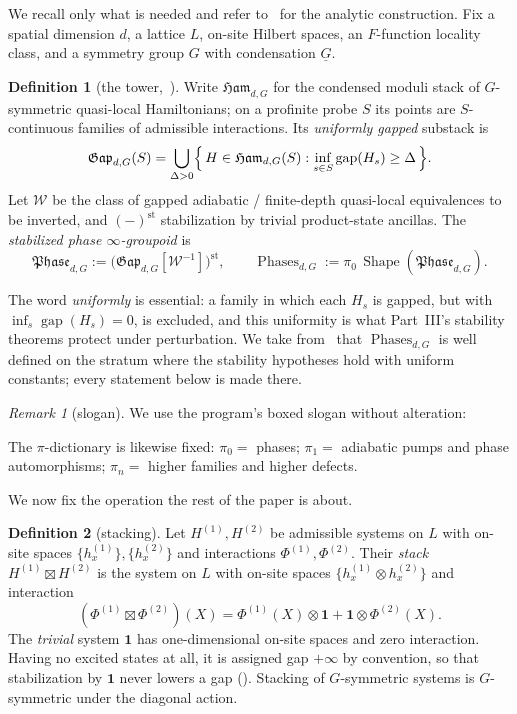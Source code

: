 \documentclass[12pt]{article}
\newcommand{\cg}[1]{\underline{#1}}            %
\newcommand{\Shape}{\operatorname{Shape}}      %
\newcommand{\Ham}{\mathfrak{Ham}}              %
\newcommand{\Gap}{\mathfrak{Gap}}              %
\newcommand{\Phase}{\mathfrak{Phase}}          %
\newcommand{\Phases}{\operatorname{Phases}}    %
\newcommand{\Weq}{\mathcal{W}}                 %
\newcommand{\st}{\mathrm{st}}                  %
\newcommand{\gapof}[1]{\operatorname{gap}(#1)} %
\newcommand{\gapbound}{\Delta}                  %
\newcommand{\triv}{\mathbf{1}}               %
\theoremstyle{definition}
\newtheorem{definition}[definition]{Definition}
\theoremstyle{remark}
\newtheorem{remark}[remark]{Remark}
\theoremstyle{plain}
\begin{document}
We recall only what is needed and refer to~\cite{paperGap} for the analytic
construction. Fix a spatial dimension $d$, a lattice $L$, on-site Hilbert spaces,
an $F$-function locality class, and a symmetry group $G$ with condensation
$\cg{G}$.

\begin{definition}[the tower,~\cite{paperLocality,paperGap}]
\label{def:tower}
Write $\Ham_{d,G}$ for the condensed moduli stack of $G$-symmetric quasi-local
Hamiltonians; on a profinite probe $S$ its points are $S$-continuous families of
admissible interactions. Its \emph{uniformly gapped} substack is
\[
  \Gap_{d,G}(S)=\bigcup_{\gapbound>0}\Bigl\{\,H\in\Ham_{d,G}(S):
  \inf_{s\in S}\gapof{H_s}\ge\gapbound\,\Bigr\}.
\]
Let $\Weq$ be the class of gapped adiabatic / finite-depth quasi-local
equivalences to be inverted, and $(-)^{\st}$ stabilization by trivial
product-state ancillas. The \emph{stabilized phase $\infty$-groupoid} is
\[
  \Phase_{d,G}:=\bigl(\Gap_{d,G}[\Weq^{-1}]\bigr)^{\st},
\qquad
  \Phases_{d,G}:=\pi_0\,\Shape(\Phase_{d,G}).
\]
\end{definition}

The word \emph{uniformly} is essential: a family in which each $H_s$ is gapped,
but with $\inf_s\gapof{H_s}=0$, is excluded, and this uniformity is what
Part~III's stability theorems protect under perturbation. We take
from~\cite{paperGap} that $\Phases_{d,G}$ is well defined on the stratum where
the stability hypotheses hold with uniform constants; every statement below is
made there.

\begin{remark}[slogan]
We use the program's boxed slogan without alteration:
\begin{center}
\end{center}
The $\pi$-dictionary is likewise fixed: $\pi_0=$ phases; $\pi_1=$ adiabatic pumps
and phase automorphisms; $\pi_n=$ higher families and higher defects.
\end{remark}

We now fix the operation the rest of the paper is about.

\begin{definition}[stacking]
\label{def:stacking}
Let $H^{(1)},H^{(2)}$ be admissible systems on $L$ with on-site spaces
$\{h_x^{(1)}\},\{h_x^{(2)}\}$ and interactions $\Phi^{(1)},\Phi^{(2)}$. Their
\emph{stack} $H^{(1)}\boxtimes H^{(2)}$ is the system on $L$ with on-site spaces
$\{h_x^{(1)}\otimes h_x^{(2)}\}$ and interaction
\[
  (\Phi^{(1)}\boxtimes\Phi^{(2)})(X)
  =\Phi^{(1)}(X)\otimes \mathbf 1 + \mathbf 1\otimes\Phi^{(2)}(X).
\]
The \emph{trivial} system $\triv$ has one-dimensional on-site spaces and zero
interaction. Having no excited states at all, it is assigned gap $+\infty$ by
convention, so that stabilization by $\triv$ never lowers a gap
(). Stacking of $G$-symmetric systems is $G$-symmetric under
the diagonal action.
\end{definition}
\end{document}
